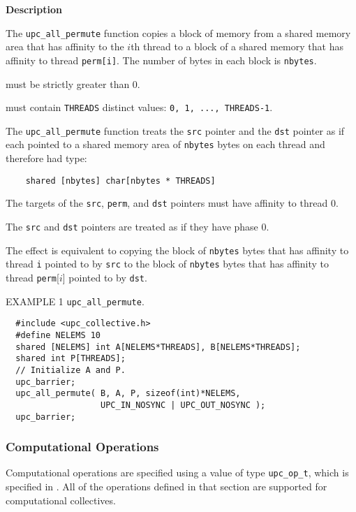 {\bf Description} 

\np The {\tt upc\_all\_permute} function copies a block of memory from a
shared memory area that has affinity to the $i$th thread to a block of a
shared memory that has affinity to thread {\tt perm[i]}.
The number of bytes in each block is {\tt nbytes}.

 must be strictly greater than 0.

 must contain {\tt THREADS} distinct
values: {\tt 0, 1, ...,  THREADS-1}.

\np The {\tt upc\_all\_permute} function treats the {\tt src} pointer
and the {\tt dst} pointer as if each pointed to a shared memory
area of {\tt nbytes} bytes on each thread and therefore had type:

\begin{verbatim}
    shared [nbytes] char[nbytes * THREADS]
\end{verbatim}  

\np The targets of the {\tt src}, {\tt perm}, and
{\tt dst} pointers must have affinity to thread 0.

\np The {\tt src} and {\tt dst} pointers are treated as
if they have phase 0.

\np The effect is equivalent to copying the block of {\tt nbytes} bytes
that has affinity to thread {\tt i} pointed to by {\tt src}
to the block of {\tt nbytes} bytes
that has affinity to thread {\tt perm}[$i$] pointed to by {\tt dst}.

\np EXAMPLE 1 {\tt upc\_all\_permute}.
\begin{verbatim}
  #include <upc_collective.h>
  #define NELEMS 10
  shared [NELEMS] int A[NELEMS*THREADS], B[NELEMS*THREADS];
  shared int P[THREADS];
  // Initialize A and P.
  upc_barrier;
  upc_all_permute( B, A, P, sizeof(int)*NELEMS,
                   UPC_IN_NOSYNC | UPC_OUT_NOSYNC );
  upc_barrier;
\end{verbatim}

\subsubsection{Computational Operations}
\label{upc-op-t-section}

\npf Computational operations are specified using a value of type
{\tt upc\_op\_t}, which is specified in \upcopsection. All of the 
operations defined in that section are supported for computational collectives.

